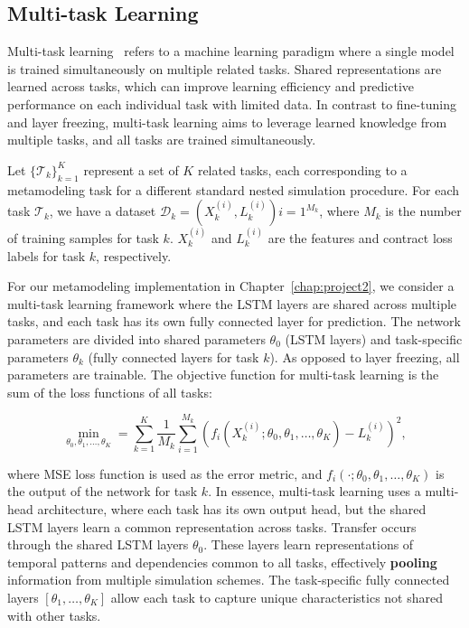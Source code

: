 \subsection{Multi-task Learning}

Multi-task learning~\citep{caruana1997multitask} refers to a machine learning paradigm where a single model is trained simultaneously on multiple related tasks.
Shared representations are learned across tasks, which can improve learning efficiency and predictive performance on each individual task with limited data.
In contrast to fine-tuning and layer freezing, multi-task learning aims to leverage learned knowledge from multiple tasks, and all tasks are trained simultaneously.

Let $\{\mathcal{T}_k\}_{k=1}^K$ represent a set of $K$ related tasks, each corresponding to a metamodeling task for a different standard nested simulation procedure.
For each task $\mathcal{T}_k$, we have a dataset $\mathcal{D}_k = { (X_k^{(i)}, L_k^{(i)}) }{i=1}^{M_k}$, where $M_k$ is the number of training samples for task $k$.
$X_k^{(i)}$ and $L_k^{(i)}$ are the features and contract loss labels for task $k$, respectively.

For our metamodeling implementation in Chapter~\ref{chap:project2}, we consider a multi-task learning framework where the LSTM layers are shared across multiple tasks, and each task has its own fully connected layer for prediction.
The network parameters are divided into shared parameters $\theta_0$ (LSTM layers) and task-specific parameters $\theta_k$ (fully connected layers for task $k$). 
As opposed to layer freezing, all parameters are trainable.
The objective function for multi-task learning is the sum of the loss functions of all tasks:

\begin{equation} 
    \min_{\theta_0, \theta_1, \dots, \theta_K} = \sum_{k=1}^K \frac{1}{M_k} \sum_{i=1}^{M_k} \left( f_i(X_k^{(i)}; \theta_0, \theta_1, \dots, \theta_K) - L_k^{(i)} \right)^2,
\end{equation}

where MSE loss function is used as the error metric, and $f_i(\cdot; \theta_0, \theta_1, \dots, \theta_K)$ is the output of the network for task $k$.
In essence, multi-task learning uses a multi-head architecture, where each task has its own output head, but the shared LSTM layers learn a common representation across tasks.
Transfer occurs through the shared LSTM layers $\theta_0$. 
These layers learn representations of temporal patterns and dependencies common to all tasks, effectively \textbf{pooling} information from multiple simulation schemes. 
The task-specific fully connected layers $[\theta_1, \dots, \theta_K]$ allow each task to capture unique characteristics not shared with other tasks.


